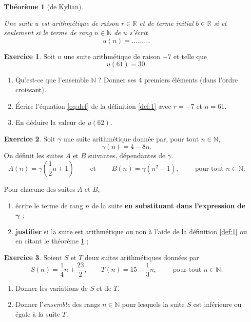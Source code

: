 \documentclass[12pt]{paper}
\theoremstyle{plain}
\newtheorem{theorem}{Th\'eor\`eme}
\theoremstyle{definition}
\newtheorem{ex}{Exercice}
\newcommand{\R}{\mathbb{R}}
\newcommand{\N}{\mathbb{N}}
\begin{document}
\begin{theorem}[de Kylian]\label{thm:1}
	
	Une suite $u$ est arithmétique de raison $r\in\R$ et de terme initial $b\in\R$ si et seulement si le terme de rang $n\in\N$ de $u$ s'écrit
		\[ u(n) = \dots\dots\dots.\]
		
\end{theorem}

\begin{ex}
	Soit $u$ une suite arithmétique de raison $-7$ et telle que
		\[u(61) = 30. \]
	\begin{enumerate}
		\item Qu'est-ce que l'ensemble $\N$ ? Donner ses $4$ premiers éléments (dans l'ordre croissant).
		\item Écrire l'équation \eqref{eq:def} de la définition \ref{def:1} avec $r=-7$ et $n=61$.
		\item En déduire la valeur de $u(62)$.
	\end{enumerate}
\end{ex}

\begin{ex}
	Soit $\gamma$ une suite arithmétique donnée par, pour tout $n\in\N$,
		\[ \gamma(n) = 4 -8n . \]
	On définit les suites $A$ et $B$ suivantes, dépendantes de $\gamma$.
		\[ A(n) = \gamma\left(\dfrac12n+1\right) \qquad \text{ et } \qquad B(n) = \gamma(n^2 - 1), \qquad \text{ pour tout }n\in\N. \]
		
	\newpage
	Pour chacune des suites $A$ et $B$, 
		\begin{enumerate}[leftmargin=2cm, label=\roman*)]
			\item écrire le terme de rang $n$ de la suite \textbf{en substituant dans l'expression de} $\boldsymbol{\gamma}$ ; 
			\item  \textbf{justifier} si la suite est arithmétique ou non à l'aide de la définition \ref{def:1} ou en citant le théorème \ref{thm:1} ; 
		\end{enumerate}
\end{ex}

\begin{ex}
	Soient $S$ et $T$ deux suites arithmétiques données par
		\[ S(n) = \dfrac{1}{4}n + \dfrac{23}2, \qquad T(n) = 15 - \dfrac{1}{3}n, \qquad \text{ pour tout } n \in \N.\]
	\begin{enumerate}
		\item Donner les variations de $S$ et de $T$.
		\item Donner l'\emph{ensemble} des rangs $n\in\N$ pour lesquels la suite $S$ est inférieure ou égale à la suite $T$.
	\end{enumerate}
\end{ex}
\end{document}
